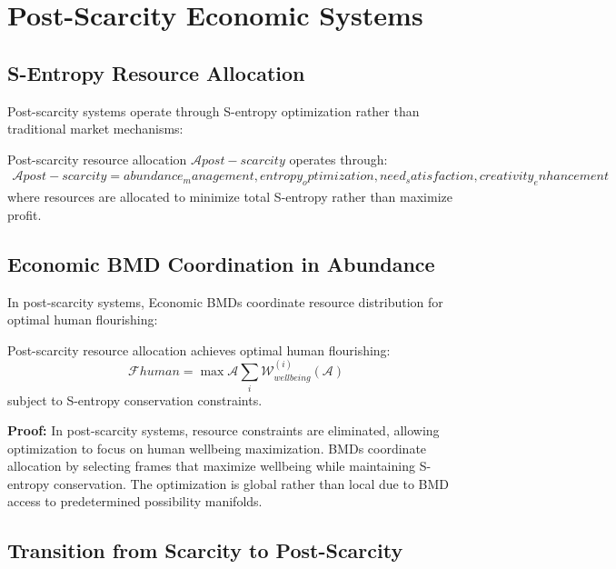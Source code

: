 \section{Post-Scarcity Economic Systems}

\subsection{S-Entropy Resource Allocation}

Post-scarcity systems operate through S-entropy optimization rather than traditional market mechanisms:

\begin{definition}
Post-scarcity resource allocation $\mathcal{A}{post-scarcity}$ operates through:
\begin{align}
\mathcal{A}{post-scarcity} = {abundance_management, entropy_optimization, need_satisfaction, creativity_enhancement}
\end{align}
where resources are allocated to minimize total S-entropy rather than maximize profit.
\end{definition}

\subsection{Economic BMD Coordination in Abundance}

In post-scarcity systems, Economic BMDs coordinate resource distribution for optimal human flourishing:

\begin{theorem}
Post-scarcity resource allocation achieves optimal human flourishing:
\begin{equation}
\mathcal{F}{human} = \max{\mathcal{A}} \sum_{i} \mathcal{W}_{wellbeing}^{(i)}(\mathcal{A})
\end{equation}
subject to S-entropy conservation constraints.

\textbf{Proof:}
In post-scarcity systems, resource constraints are eliminated, allowing optimization to focus on human wellbeing maximization. BMDs coordinate allocation by selecting frames that maximize wellbeing while maintaining S-entropy conservation. The optimization is global rather than local due to BMD access to predetermined possibility manifolds.
\end{theorem}

\subsection{Transition from Scarcity to Post-Scarcity}

